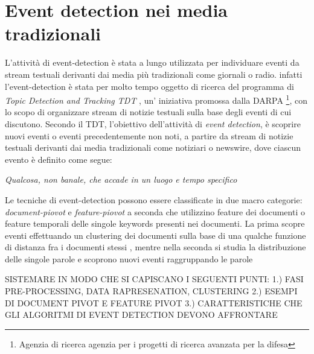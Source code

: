 


\section{Event detection nei media tradizionali}
\color{red}
L'attività di event-detection è stata a lungo utilizzata per individuare eventi da stream testuali derivanti dai media più tradizionali come giornali o radio. infatti l'event-detection è stata per molto tempo oggetto di ricerca del programma di \emph{Topic Detection and Tracking TDT} \cite{Allan:2002:TDT:772260}, un' iniziativa	promossa dalla DARPA \footnote{Agenzia di ricerca agenzia per i progetti di ricerca avanzata per la difesa}, con lo scopo di organizzare stream di notizie testuali sulla base degli eventi di cui discutono. Secondo il TDT, l'obiettivo dell'attività di \emph{event detection}, è scoprire nuovi  eventi o eventi precedentemente non noti, a partire da stream di notizie testuali derivanti dai media tradizionali come notiziari o newswire, dove ciascun evento è definito come segue:


\begin{definizione}[Evento]
\label{def:evento}
\emph{Qualcosa, non banale, che accade in un luogo e tempo specifico}
\end{definizione}


Le tecniche di event-detection possono essere classificate in due macro categorie: \emph{document-piovot} e \emph{feature-piovot} a seconda che utilizzino feature dei documenti o feature temporali delle singole keywords presenti nei documenti. 
La prima scopre eventi effettuando un clustering dei documenti sulla base di una qualche funzione di distanza fra i documenti stessi \cite{Yang:1998:SRO:290941.290953}, mentre nella seconda si studia la distribuzione delle singole parole e scoprono nuovi eventi raggruppando le parole \cite{Kleinberg:2002:BHS:775047.775061} 



SISTEMARE IN MODO CHE SI CAPISCANO I SEGUENTI PUNTI:
1.) FASI PRE-PROCESSING, DATA RAPRESENATION, CLUSTERING
2.) ESEMPI DI DOCUMENT PIVOT E FEATURE PIVOT
3.) CARATTERISTICHE CHE GLI ALGORITMI DI EVENT DETECTION DEVONO AFFRONTARE


